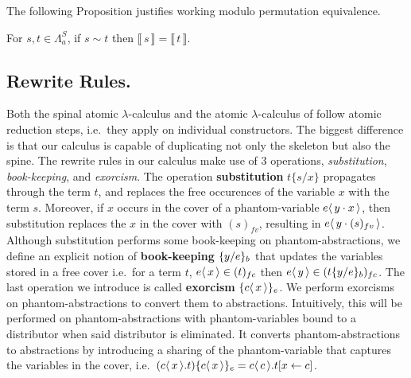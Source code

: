 \documentclass[runningheads]{llncs}
\let\vec\relax
\newcommand\defn{\textbf}
\newcommand{\FALC}{\Lambda^{S}_{a}}
\newcommand{\fv}[1]{(#1)_{fv}}
\newcommand{\fc}[1]{(#1)_{fc}}
\newcommand{\fake}[3]{#1 \langle \, #2 \, \rangle . #3}
\newcommand{\share}[3]{#1 [#2 \leftarrow #3]}
\newcommand{\fakedist}[2]{#1 \langle \, #2 \, \rangle}
\newcommand{\sub}[3]{#1 \{ #2 / #3 \}}
\newcommand{\psub}[3]{#1 \{ #2 / #3 \}_{b}}
\newcommand{\exor}[3]{#1 \{ \fakedist{#2}{#3} \}_{e}}
\newcommand{\trans}[1]{\llbracket \, #1 \, \rrbracket}
\begin{document}
\noindent The following Proposition justifies working modulo permutation equivalence.
\begin{proposition}
\label{lem:preservedenotationsim}
For $s, t \in \FALC$, if $s \sim t$ then $\trans{s} = \trans{t}$.
\end{proposition}

\subsection{Rewrite Rules.}

Both the spinal atomic $\lambda$-calculus and the atomic $\lambda$-calculus of \cite{Gundersen-Heijltjes-Parigot-2013-LICS} follow atomic reduction steps, i.e.\ they apply on individual constructors. The biggest difference is that our calculus is capable of duplicating not only the skeleton but also the spine. The rewrite rules in our calculus make use of 3 operations, \emph{substitution}, \emph{book-keeping}, and \emph{exorcism}. The operation \defn{substitution} $\sub{t}{s}{x}$ propagates through the term $t$, and replaces the free occurences of the variable $x$ with the term $s$. Moreover, if $x$ occurs in the cover of a phantom-variable $\fakedist{e}{\vec{y} \cdot x}$, then substitution replaces the $x$ in the cover with $\fv{s}$, resulting in $\fakedist{e}{\vec{y} \cdot \fv{s}}$. Although substitution performs some book-keeping on phantom-abstractions, we define an explicit notion of \defn{book-keeping} $\psub{}{\vec{y}}{e}$ that updates the variables stored in a free cover i.e.\ for a term $t$, $\fakedist{e}{\vec{x}} \in \fc{t}$ then $\fakedist{e}{\vec{y}} \in \fc{\psub{t}{\vec{y}}{e}}$. The last operation we introduce is called \defn{exorcism} $\exor{}{c}{\vec{x}}$. We perform exorcisms on phantom-abstractions to convert them to abstractions. Intuitively, this will be performed on phantom-abstractions with phantom-variables bound to a distributor when said distributor is eliminated. It converts phantom-abstractions to abstractions by introducing a sharing of the phantom-variable that captures the variables in the cover, i.e.\ $(\fake{c}{\vec{x}}{t}) \exor{}{c}{\vec{x}} = \fake{c}{c}{\share{t}{\vec{x}}{c}}$. 
\end{document}
